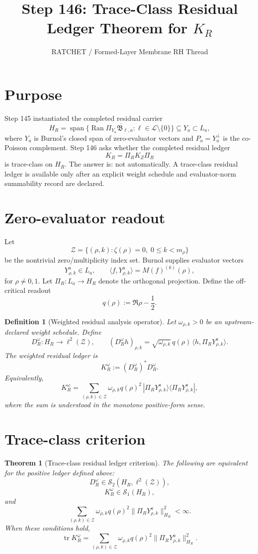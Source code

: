 \documentclass[11pt]{article}
\title{Step 146: Trace-Class Residual Ledger Theorem for $K_R$}
\author{RATCHET / Formed-Layer Membrane RH Thread}
\date{}
\newtheorem{theorem}{Theorem}
\newtheorem{definition}{Definition}
\begin{document}
\maketitle

\section{Purpose}
Step 145 instantiated the completed residual carrier
\[
H_R=\overline{\operatorname{span}\{\operatorname{Ran}\Pi_{Y_a}\mathfrak B_{\ell,a}:\ell\in\mathcal L\setminus\{0\}\}}
\subseteq Y_a\subset L_a,
\]
where $Y_a$ is Burnol's closed span of zero-evaluator vectors and $P_a=Y_a^\perp$ is the co-Poisson complement.
Step 146 asks whether the completed residual ledger
\[
K_R=\Pi_RK_Z\Pi_R
\]
is trace-class on $H_R$.  The answer is: not automatically.  A trace-class residual ledger is available only after an explicit weight schedule and evaluator-norm summability record are declared.

\section{Zero-evaluator readout}
Let
\[
\mathcal Z=\{(\rho,k):\zeta(\rho)=0,\;0\le k<m_\rho\}
\]
be the nontrivial zero/multiplicity index set.  Burnol supplies evaluator vectors
\[
Y^a_{\rho,k}\in L_a,
\qquad
\langle f,Y^a_{\rho,k}\rangle=M(f)^{(k)}(\rho),
\]
for $\rho\neq 0,1$.  Let $\Pi_R:L_a\to H_R$ denote the orthogonal projection.  Define the off-critical readout
\[
q(\rho):=\Re\rho-\frac12.
\]

\begin{definition}[Weighted residual analysis operator]
Let $\omega_{\rho,k}>0$ be an upstream-declared weight schedule.  Define
\[
D_R^{\omega}:H_R\to \ell^2(\mathcal Z),
\qquad
(D_R^{\omega}h)_{\rho,k}
=\sqrt{\omega_{\rho,k}}\,q(\rho)\,\langle h,\Pi_RY^a_{\rho,k}\rangle.
\]
The weighted residual ledger is
\[
K_R^{\omega}:=(D_R^{\omega})^*D_R^{\omega}.
\]
Equivalently,
\[
K_R^{\omega}
=\sum_{(\rho,k)\in\mathcal Z}
\omega_{\rho,k}q(\rho)^2
\,|\Pi_RY^a_{\rho,k}\rangle\langle\Pi_RY^a_{\rho,k}|,
\]
where the sum is understood in the monotone positive-form sense.
\end{definition}

\section{Trace-class criterion}
\begin{theorem}[Trace-class residual ledger criterion]
The following are equivalent for the positive ledger defined above:
\[
D_R^{\omega}\in\mathcal S_2(H_R,\ell^2(\mathcal Z)),
\]
\[
K_R^{\omega}\in\mathcal S_1(H_R),
\]
and
\[
\boxed{
\sum_{(\rho,k)\in\mathcal Z}
\omega_{\rho,k}q(\rho)^2
\|\Pi_RY^a_{\rho,k}\|_{H_R}^2<\infty.
}
\]
When these conditions hold,
\[
\boxed{
\operatorname{tr}K_R^{\omega}
=\sum_{(\rho,k)\in\mathcal Z}
\omega_{\rho,k}q(\rho)^2
\|\Pi_RY^a_{\rho,k}\|_{H_R}^2.
}
\]
\end{theorem}
\end{document}
